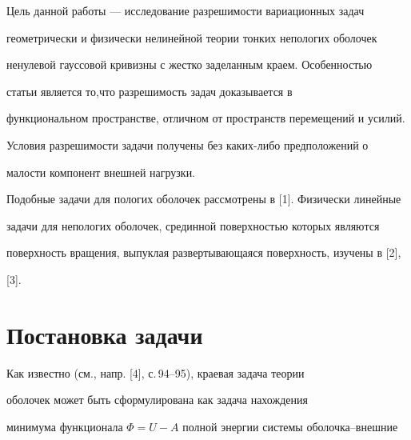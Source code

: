 \pagestyle{plain} %


 




\maketitle 


\label{begin} 


 


 


Цель данной работы --- исследование разрешимости вариационных задач 


геометрически и физически нелинейной теории тонких непологих оболочек 


ненулевой гауссовой кривизны с жестко заделанным краем. Особенностью 


статьи является то,что разрешимость задач доказывается в 


функциональном пространстве, отличном от пространств перемещений и усилий. 


Условия разрешимости задачи получены без каких-либо предположений о 


малости компонент внешней нагрузки. 


 


Подобные задачи для пологих оболочек рассмотрены в [1]. Физически линейные 


задачи для непологих оболочек, срединной поверхностью которых являются 


поверхность вращения, выпуклая развертывающаяся поверхность, изучены в [2], 


[3]. 


 


\section{Постановка задачи} 


 


Как известно (см., напр. [4], с.\,94--95), краевая задача теории 


оболочек может быть сформулирована как задача нахождения 


минимума функционала $\Phi=U-A$ полной энергии системы оболочка--внешние 


